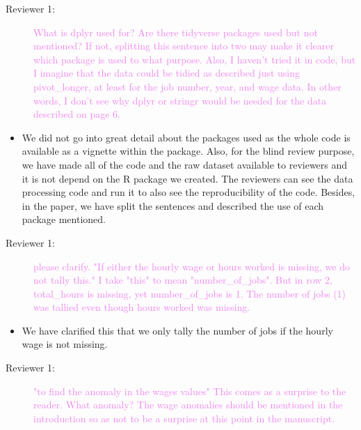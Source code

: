 \documentclass[12pt,a4paper,]{article}
\providecommand{\tightlist}{%
  \setlength{\itemsep}{0pt}\setlength{\parskip}{0pt}}
\begin{document}
\begin{description}
\item[Reviewer 1:]\textcolor{violet}{What is dplyr used for? Are there tidyverse packages used but not mentioned? If not, splitting this sentence into two may make it clearer which package is used to what purpose. Also, I haven't tried it in code, but I imagine that the data could be tidied as described just using pivot\_longer, at least for the job number, year, and wage data. In other words, I don't see why dplyr or stringr would be needed for the data described on page 6.}
\end{description}

\begin{itemize}
\tightlist
\item
  We did not go into great detail about the packages used as the whole code is available as a vignette within the package. Also, for the blind review purpose, we have made all of the code and the raw dataset available to reviewers and it is not depend on the R package we created. The reviewers can see the data processing code and run it to also see the reproducibility of the code. Besides, in the paper, we have split the sentences and described the use of each package mentioned.
\end{itemize}

\begin{description}
\item[Reviewer 1:]\textcolor{violet}{please clarify. "If either the hourly wage or hours worked is missing, we do not tally this." I take "this" to mean "number\_of\_jobs". But in row 2, total\_hours is missing, yet number\_of\_jobs is 1. The number of jobs (1) was tallied even though hours worked was missing.}
\end{description}

\begin{itemize}
\tightlist
\item
  We have clarified this that we only tally the number of jobs if the hourly wage is not missing.
\end{itemize}

\begin{description}
\item[Reviewer 1:]\textcolor{violet}{"to find the anomaly in the wages values" This comes as a surprise to the reader. What anomaly? The wage anomalies should be mentioned in the introduction so as not to be a surprise at this point in the manuscript.}
\end{description}
\end{document}
